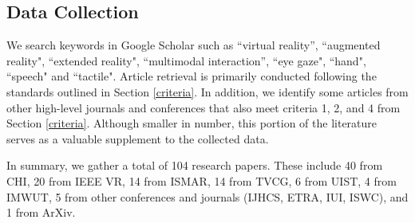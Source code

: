 \documentclass[review]{fcs}
\begin{document}



\subsection{Data Collection}

We search keywords in Google Scholar such as ``virtual reality'', ``augmented reality", ``extended reality", ``multimodal interaction'', ``eye gaze", ``hand", ``speech" and ``tactile". 
Article retrieval is primarily conducted following the standards outlined in Section \ref{criteria}. In addition, we identify some articles from other high-level journals and conferences that also meet criteria 1, 2, and 4 from Section \ref{criteria}. Although smaller in number, this portion of the literature serves as a valuable supplement to the collected data.

In summary, we gather a total of 104 research papers. These include 40 from CHI, 20 from IEEE VR, 14 from ISMAR, 14 from TVCG, 6 from UIST, 4 from IMWUT, 5 from other conferences and journals (IJHCS, ETRA, IUI, ISWC), and 1 from ArXiv.

\end{document}
